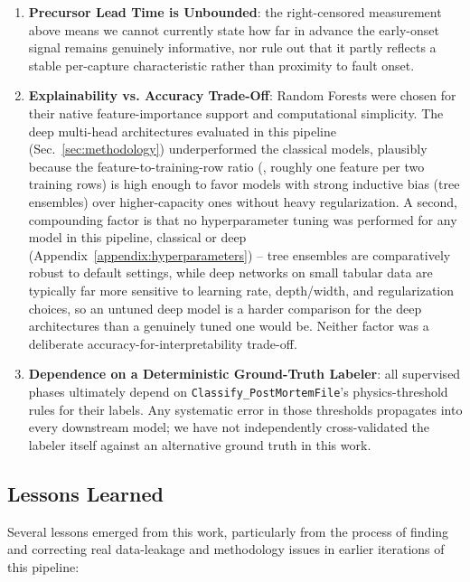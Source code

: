 \begin{enumerate}
    \item \textbf{Precursor Lead Time is Unbounded}: the right-censored measurement above means we cannot currently state how far in advance the early-onset signal remains genuinely informative, nor rule out that it partly reflects a stable per-capture characteristic rather than proximity to fault onset.

    \item \textbf{Explainability vs. Accuracy Trade-Off}: Random Forests were chosen for their native feature-importance support and computational simplicity. The deep multi-head architectures evaluated in this pipeline (Sec.~\ref{sec:methodology}) underperformed the classical models, plausibly because the feature-to-training-row ratio (\MetricOneZeroPhaseThreeWeaknessDiagnosisFeatureToTrainRowRatio, roughly one feature per two training rows) is high enough to favor models with strong inductive bias (tree ensembles) over higher-capacity ones without heavy regularization. A second, compounding factor is that no hyperparameter tuning was performed for any model in this pipeline, classical or deep (Appendix~\ref{appendix:hyperparameters}) -- tree ensembles are comparatively robust to default settings, while deep networks on small tabular data are typically far more sensitive to learning rate, depth/width, and regularization choices, so an untuned deep model is a harder comparison for the deep architectures than a genuinely tuned one would be. Neither factor was a deliberate accuracy-for-interpretability trade-off.

    \item \textbf{Dependence on a Deterministic Ground-Truth Labeler}: all supervised phases ultimately depend on \texttt{Classify\_PostMortemFile}'s physics-threshold rules for their labels. Any systematic error in those thresholds propagates into every downstream model; we have not independently cross-validated the labeler itself against an alternative ground truth in this work.
\end{enumerate}

\subsection{Lessons Learned}

Several lessons emerged from this work, particularly from the process of finding and correcting real data-leakage and methodology issues in earlier iterations of this pipeline:

